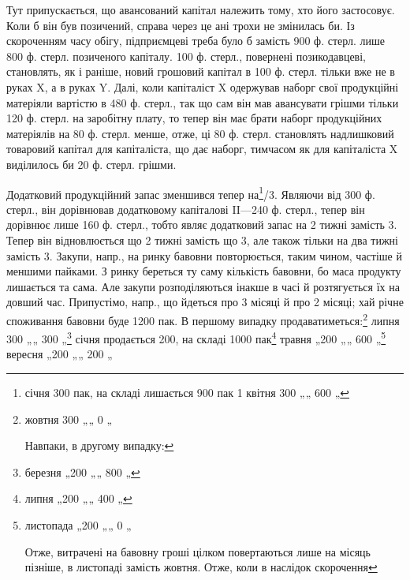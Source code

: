 Тут припускається, що авансований капітал належить тому, хто його
застосовує. Коли б він був позичений, справа через це ані трохи не змінилась
би. Із скороченням часу обігу, підприємцеві треба було б замість
900 ф. стерл. лише 800 ф. стерл. позиченого капіталу. 100 ф. стерл.,
повернені позикодавцеві, становлять, як і раніше, новий грошовий капітал
в 100 ф. стерл. тільки вже не в руках X, а в руках Y. Далі, коли
капіталіст X одержував наборг свої продукційні матеріяли вартістю в
480 ф. стерл., так що сам він мав авансувати грішми тільки 120 ф. стерл.
на заробітну плату, то тепер він має брати наборг продукційних матеріялів
на 80 ф. стерл. менше, отже, ці 80 ф. стерл. становлять надлишковий
товаровий капітал для капіталіста, що дає наборг, тимчасом як
для капіталіста X виділилось би 20 ф. стерл. грішми.

Додатковий продукційний запас зменшився тепер на\footnote{
січня 300 пак, на складі лишається 900 пак
1 квітня 300 „„    600 „
}/3. Являючи 
від 300 ф. стерл., він дорівнював додатковому капіталові II—240 ф.
стерл., тепер він дорівнює лише 160 ф. стерл., тобто являє додатковий
запас на 2 тижні замість 3. Тепер він відновлюється що 2 тижні замість
що 3, але також тільки на два тижні замість 3. Закупи, напр., на ринку
бавовни повторюється, таким чином, частіше й меншими пайками. З ринку
береться ту саму кількість бавовни, бо маса продукту лишається та
сама. Але закупи розподіляються інакше в часі й розтягується їх на довший
час. Припустімо, напр., що йдеться про 3 місяці й про 2 місяці; хай
річне споживання бавовни буде 1200 пак. В першому випадку продаватиметься:\footnote{
жовтня 300 „„    0 „

Навпаки, в другому випадку:
} липня 300 „„    300 „\footnote{
березня „200 „„    800 „
} січня продається 200, на    складі    1000    пак\footnote{
липня „200 „„    400 „
} травня „200 „„    600 „\footnote{
листопада „200 „„    0 „

Отже, витрачені на бавовну гроші цілком повертаються лише на місяць
пізніше, в листопаді замість жовтня. Отже, коли в наслідок скорочення
} вересня „200 „„    200 „
\parbreak{}  %
